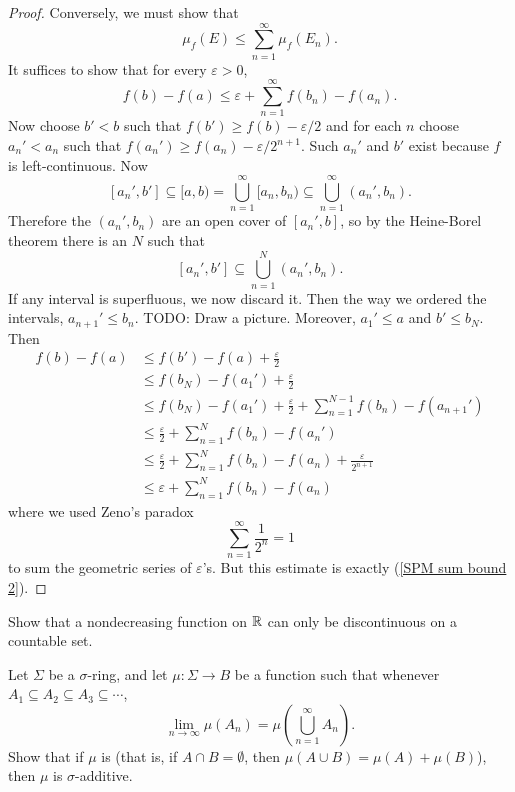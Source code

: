 \begin{proof}
Conversely, we must show that
\[\mu_f(E) \leq \sum_{n=1}^{\infty} \mu_f(E_{n}).\]
It suffices to show that for every $\varepsilon > 0$,
\begin{equation}
\label{SPM sum bound 2}
f(b) - f(a) \leq \varepsilon + \sum_{n=1}^{\infty} f(b_{n}) - f(a_{n}).
\end{equation}
Now choose $b' < b$ such that $f(b') \geq f(b) - \varepsilon/2$ and for each $n$ choose $a_{n}' < a_{n}$ such that $f(a_{n}') \geq f(a_{n}) - \varepsilon/2^{n+1}$.
Such $a_{n}'$ and $b'$ exist because $f$ is left-continuous.
Now
\[[a_{n}', b'] \subseteq [a, b) = \bigcup_{n=1}^{\infty} [a_{n}, b_{n}) \subseteq \bigcup_{n=1}^{\infty} (a_{n}', b_{n}).\]
Therefore the $(a_{n}', b_{n})$ are an open cover of $[a_{n}', b]$, so by the Heine-Borel theorem there is an $N$ such that
\[[a_{n}', b'] \subseteq \bigcup_{n=1}^{N} (a_{n}', b_{n}).\]
If any interval is superfluous, we now discard it.
Then the way we ordered the intervals, $a_{n+1}' \leq b_{n}$.
TODO: Draw a picture.
Moreover, $a_1' \leq a$ and $b' \leq b_N$. Then
\begin{align*}
f(b) - f(a) &\leq f(b') - f(a) + \frac{\varepsilon}{2}\\
& \leq f(b_N) - f(a_1') + \frac{\varepsilon}{2}\\
& \leq f(b_N) - f(a_1') + \frac{\varepsilon}{2} + \sum_{n=1}^{N-1} f(b_{n}) - f(a_{n+1}')\\
& \leq \frac{\varepsilon}{2} + \sum_{n=1}^{N} f(b_{n}) - f(a_{n}')\\
& \leq \frac{\varepsilon}{2} + \sum_{n=1}^{N} f(b_{n}) - f(a_{n}) + \frac{\varepsilon}{2^{n+1}}\\
& \leq \varepsilon + \sum_{n=1}^{N} f(b_{n}) - f(a_{n})
\end{align*}
where we used Zeno's paradox
\begin{equation}
\label{zeno}
\sum_{n=1}^{\infty} \frac{1}{2^n} = 1
\end{equation}
to sum the geometric series of $\varepsilon$'s.
But this estimate is exactly (\ref{SPM sum bound 2}).
\end{proof}

\begin{exercise}
\label{nondecreasing exercise}
Show that a nondecreasing function on $\mathbb{R}$ can only be discontinuous on a countable set.
\end{exercise}

\begin{exercise}
Let $\Sigma$ be a $\sigma$-ring, and let $\mu: \Sigma \to B$ be a function such that whenever $A_1 \subseteq A_2 \subseteq A_3 \subseteq \cdots$,
\[\lim_{n \to \infty} \mu(A_{n}) = \mu\left(\bigcup_{n=1}^{\infty} A_{n}\right).\]
Show that if $\mu$ is  (that is, if $A \cap B = \emptyset$, then $\mu(A \cup B) = \mu(A) + \mu(B)$), then $\mu$ is $\sigma$-additive.
\end{exercise}

